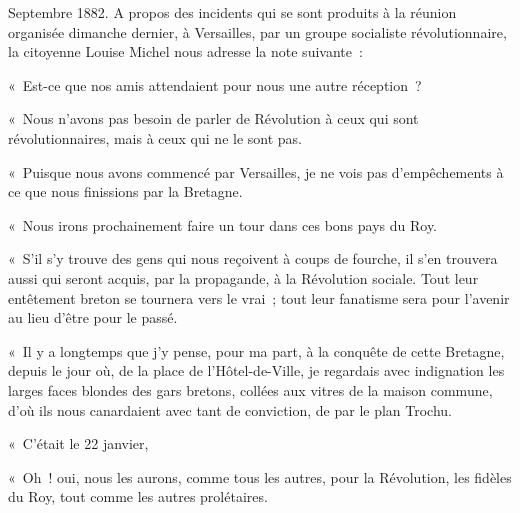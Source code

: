 \documentclass[french,twoside]{book} %
\newenvironment{quoteblock}%
  {\begin{quoting}}
  {\end{quoting}}
\newenvironment{quotebar}{%
    \def\FrameCommand{{\color{rubric!10!}\vrule width 0.5em} \hspace{0.9em}}%
    \def\OuterFrameSep{\itemsep} %
    \MakeFramed {\advance\hsize-\width \FrameRestore}
  }%
  {%
    \endMakeFramed
  }
\renewenvironment{quoteblock}%
  {%
    \savenotes
    \setstretch{0.9}
    \normalfont
    \begin{quotebar}
  }
  {%
    \end{quotebar}
    \spewnotes
  }
\begin{document}
\begin{quoteblock}
 Septembre 1882. \noindent A propos des incidents qui se sont produits à la réunion organisée dimanche dernier, à Versailles, par un groupe socialiste révolutionnaire, la citoyenne Louise Michel nous adresse la note suivante :\par
 « Est-ce que nos amis attendaient pour nous une autre réception ?\par
 « Nous n’avons pas besoin de parler de Révolution à ceux qui sont révolutionnaires, mais à ceux qui ne le sont pas.\par
 « Puisque nous avons commencé par Versailles, je ne vois pas d’empêchements à ce que nous finissions par la Bretagne.\par
 « Nous irons prochainement faire un tour dans ces bons pays du Roy.\par
 « S’il s’y trouve des gens qui nous reçoivent à coups de fourche, il s’en trouvera aussi qui seront acquis, par la propagande, à la Révolution sociale. Tout leur entêtement  breton se tournera vers le vrai ; tout leur fanatisme sera pour l’avenir au lieu d’être pour le passé.\par
 « Il y a longtemps que j’y pense, pour ma part, à la conquête de cette Bretagne, depuis le jour où, de la place de l’Hôtel-de-Ville, je regardais avec indignation les larges faces blondes des gars bretons, collées aux vitres de la maison commune, d’où ils nous canardaient avec tant de conviction, de par le plan Trochu.\par
 « C’était le 22 janvier,\par
 « Oh ! oui, nous les aurons, comme tous les autres, pour la Révolution, les fidèles du Roy, tout comme les autres prolétaires.\par
 


\end{quoteblock}
\end{document}
